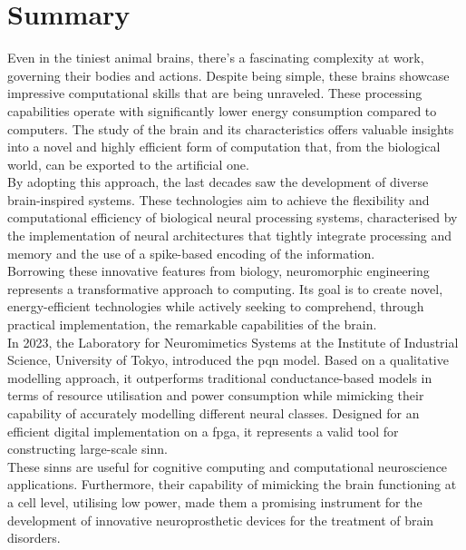 \chapter*{Summary}
Even in the tiniest animal brains, there's a fascinating complexity at work, 
governing their bodies and actions. Despite being simple, 
these brains showcase impressive computational skills that are being unraveled. 
These processing capabilities operate with 
significantly lower energy consumption compared to computers. The study of 
the brain and its characteristics offers valuable insights into a novel and 
highly efficient form of computation that, from the biological world, can 
be exported to the artificial one.\\
By adopting this approach, the last decades saw the development of diverse 
brain-inspired systems. These technologies aim to achieve the flexibility 
and computational efficiency of biological neural processing systems, 
characterised by the implementation of neural architectures that tightly 
integrate processing and memory and the use of a spike-based encoding of the 
information.\\
Borrowing these innovative features from biology, neuromorphic engineering 
represents a transformative approach to computing. Its goal is to create 
novel, energy-efficient technologies while actively seeking to comprehend, 
through practical implementation, the remarkable capabilities of the 
brain.\\

In 2023, the Laboratory for Neuromimetics Systems at the Institute of Industrial Science, University of Tokyo, introduced the \acrfull{pqn} model. Based on a qualitative modelling approach, it outperforms traditional conductance-based models in terms of resource utilisation and power consumption while mimicking their capability of accurately modelling different neural classes. Designed for an efficient digital implementation on a \acrfull{fpga}, it represents a valid tool for constructing large-scale \acrfull{sinn}. \\
These \acrshort{sinn}s are useful for cognitive computing and computational neuroscience applications. Furthermore, their capability of mimicking the brain functioning at a cell level, utilising low power, made them a promising instrument for the development of innovative neuroprosthetic devices for the treatment of brain disorders.\\

